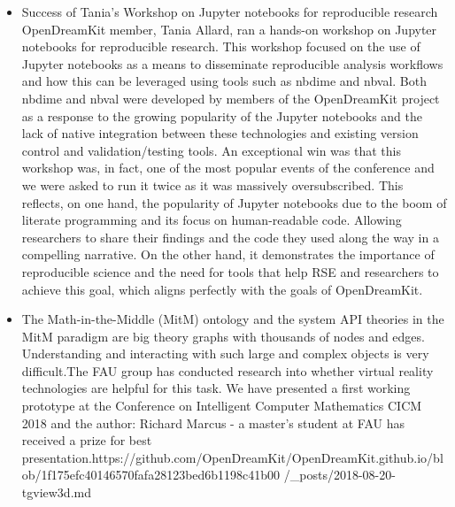 \begin{enumerate}
\begin{itemize}
\begin{itemize}
  \item Success of Tania's Workshop on Jupyter notebooks for reproducible research
  OpenDreamKit member, Tania Allard, ran a hands-on workshop on Jupyter notebooks for reproducible research. This workshop focused on 
  the use of Jupyter notebooks as a means to disseminate reproducible analysis workflows and how this can be leveraged using tools 
  such as nbdime and nbval. Both nbdime and nbval were developed by members of the OpenDreamKit project as a response to the growing 
  popularity of the Jupyter notebooks and the lack of native integration between these technologies and existing version control and 
  validation/testing tools.
  An exceptional win was that this workshop was, in fact, one of the most popular events of the conference and we were asked to run 
  it twice as it was massively oversubscribed. This reflects, on one hand, the popularity of Jupyter notebooks due to the boom of 
  literate programming and its focus on human-readable code. Allowing researchers to share their findings and the code they used 
  along the way in a compelling narrative. On the other hand, it demonstrates the importance of reproducible science and the need for 
  tools that help RSE and researchers to achieve this goal, which aligns perfectly with the goals of OpenDreamKit.

 \item The Math-in-the-Middle (MitM) ontology and the system API theories in the MitM paradigm are big theory graphs with thousands of 
nodes and edges. Understanding and interacting with such large and complex objects is very difficult.The FAU group has conducted
research into whether virtual reality technologies are helpful for this task. We have presented a first working prototype at the
Conference on Intelligent Computer Mathematics CICM 2018 and the author: Richard Marcus - a master's student at FAU has received a
prize for best presentation.https://github.com/OpenDreamKit/OpenDreamKit.github.io/blob/1f175efc40146570fafa28123bed6b1198c41b00
/_posts/2018-08-20-tgview3d.md  
\end{itemize}
 
  


\end{itemize}
\end{enumerate}
